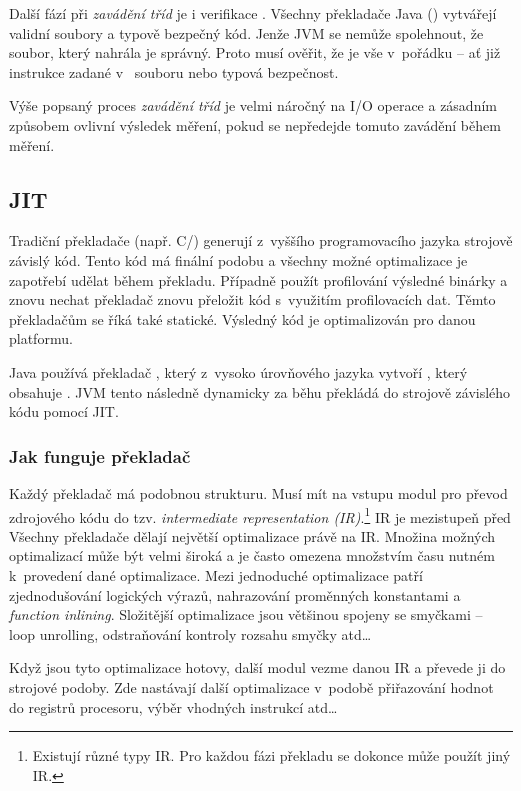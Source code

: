 Další fází při \emph{zavádění tříd} je i verifikace \bytecode{}. Všechny překladače Java (\javac{}) vytvářejí validní \classfile{} soubory a typově bezpečný kód. Jenže JVM se nemůže spolehnout, že soubor, který nahrála je správný. Proto musí ověřit, že je vše v~pořádku -- ať již instrukce zadané v~\classfile{} souboru nebo typová bezpečnost.

Výše popsaný proces \emph{zavádění tříd} je velmi náročný na I/O operace a zásadním způsobem ovlivní výsledek měření, pokud se nepředejde tomuto zavádění během měření.

\subsection{JIT\label{sub:JIT}}
Tradiční překladače (např. C/\CC) generují z~vyššího programovacího jazyka strojově závislý kód. Tento kód má finální podobu a všechny možné optimalizace je zapotřebí udělat během překladu. Případně použít profilování výsledné binárky a znovu nechat překladač znovu přeložit kód s~využitím profilovacích dat. Těmto překladačům se říká také statické. Výsledný kód je optimalizován pro danou platformu.

Java používá překladač \javac{}, který z~vysoko úrovňového jazyka vytvoří \classfile{}, který obsahuje \bytecode{}. JVM tento \bytecode{} následně dynamicky za běhu překládá do strojově závislého kódu pomocí JIT.

\subsubsection{Jak funguje překladač}
Každý překladač má podobnou strukturu. Musí mít na vstupu modul pro převod zdrojového kódu do tzv. \emph{intermediate representation (IR)}.\footnote{Existují různé typy IR. Pro každou fázi překladu se dokonce může použít jiný IR.} IR je mezistupeň před  Všechny překladače dělají největší optimalizace právě na IR. Množina možných optimalizací může být velmi široká a je často omezena množstvím času nutném k~provedení dané optimalizace. Mezi jednoduché optimalizace patří zjednodušování logických výrazů, nahrazování proměnných konstantami a \emph{function inlining}. Složitější optimalizace jsou většinou spojeny se smyčkami -- loop unrolling, odstraňování kontroly rozsahu smyčky atd\ldots{}

Když jsou tyto optimalizace hotovy, další modul vezme danou IR a převede ji do strojové podoby. Zde nastávají další optimalizace v~podobě přiřazování hodnot do registrů procesoru, výběr vhodných instrukcí atd\ldots{}

